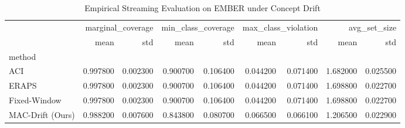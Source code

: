 \begin{table}
\caption{Empirical Streaming Evaluation on EMBER under Concept Drift}
\label{tab:streaming_benchmark}
\begin{tabular}{lrrrrrrrr}
\toprule
 & \multicolumn{2}{r}{marginal_coverage} & \multicolumn{2}{r}{min_class_coverage} & \multicolumn{2}{r}{max_class_violation} & \multicolumn{2}{r}{avg_set_size} \\
 & mean & std & mean & std & mean & std & mean & std \\
method &  &  &  &  &  &  &  &  \\
\midrule
ACI & 0.997800 & 0.002300 & 0.900700 & 0.106400 & 0.044200 & 0.071400 & 1.682000 & 0.025500 \\
ERAPS & 0.997800 & 0.002300 & 0.900700 & 0.106400 & 0.044200 & 0.071400 & 1.698800 & 0.022700 \\
Fixed-Window & 0.997800 & 0.002300 & 0.900700 & 0.106400 & 0.044200 & 0.071400 & 1.698800 & 0.022700 \\
MAC-Drift (Ours) & 0.988200 & 0.007600 & 0.843800 & 0.080700 & 0.066500 & 0.066100 & 1.206500 & 0.022900 \\
\bottomrule
\end{tabular}
\end{table}
